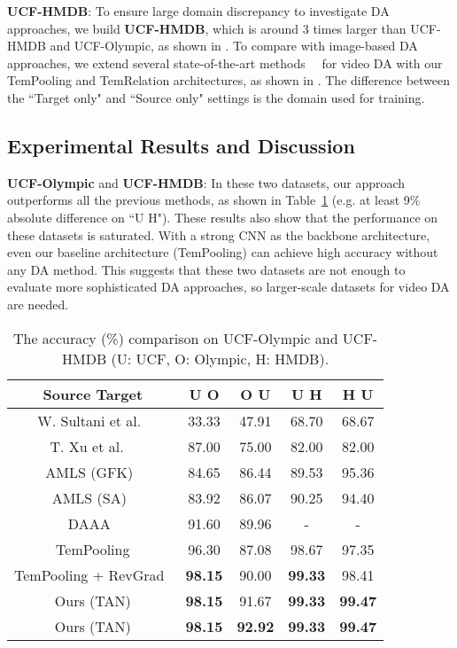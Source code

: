\documentclass[10pt,twocolumn,letterpaper]{article}
\begin{document}
\noindent\textbf{UCF-HMDB}:
To ensure large domain discrepancy to investigate DA approaches, 
we build \textbf{UCF-HMDB}, which is around 3 times larger than UCF-HMDB and UCF-Olympic, as shown in . 
To compare with image-based DA approaches, we extend several state-of-the-art methods~~\cite{ganin2015unsupervised, long2017deep, li2018adaptive, saito2018maximum} for video DA with our TemPooling and TemRelation architectures, as shown in . The difference between the ``Target only" and ``Source only" settings is the domain used for training. 

\subsection{Experimental Results and Discussion} \label{sec:experimental_results}
\noindent\textbf{UCF-Olympic} and \textbf{UCF-HMDB}:
In these two datasets, our approach outperforms all the previous methods,
as shown in Table~\ref{table:sota_ucf-olympic_ucf-hmdb-small} (e.g. at least 9\% absolute difference on ``U  H").
These results also show that the performance on these datasets is saturated. With a strong CNN as the backbone architecture, even our baseline architecture (TemPooling) can achieve high accuracy without any DA method.
This suggests that these two datasets are not enough to evaluate more sophisticated DA approaches, so larger-scale datasets for video DA are needed.

\begin{table}[!t]
\centering
\footnotesize
    \begin{tabular}{c|c|c|c|c}
    Source  Target & U  O & O  U & U  H & H  U \\ \hline
    W. Sultani et al.~\cite{sultani2014human} & 33.33 & 47.91 & 68.70 & 68.67 \\ 
    T. Xu et al. ~\cite{xu2016dual} & 87.00 & 75.00 & 82.00 & 82.00 \\ 
    AMLS (GFK)~\cite{jamal2018deep} & 84.65 & 86.44 & 89.53 & 95.36 \\ 
    AMLS (SA)~\cite{jamal2018deep} & 83.92 & 86.07 & 90.25 & 94.40 \\ 
    DAAA~\cite{jamal2018deep} & 91.60 & 89.96 & - & - \\ \hline
    TemPooling & 96.30 & 87.08 & 98.67 & 97.35 \\ 
    TemPooling + RevGrad~\cite{ganin2015unsupervised} & \textbf{98.15} & 90.00 & \textbf{99.33} & 98.41 \\ \hline\hline 
    Ours (TAN) & \textbf{98.15} & 91.67 & \textbf{99.33} & \textbf{99.47} \\ 
    Ours (TAN) & \textbf{98.15} & \textbf{92.92} & \textbf{99.33} & \textbf{99.47} \\ \hline
    \end{tabular}
\caption{The accuracy (\%) comparison on UCF-Olympic and UCF-HMDB (U: UCF, O: Olympic, H: HMDB). 
} 
\label{table:sota_ucf-olympic_ucf-hmdb-small}
\end{table}
\end{document}
